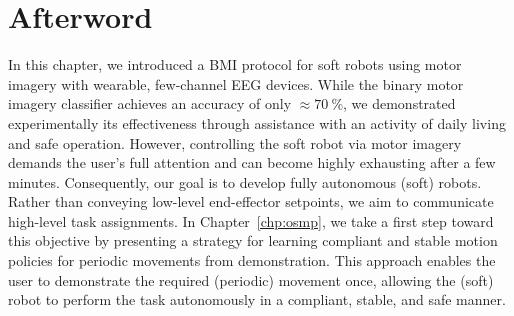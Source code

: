 \newpage







\section*{Afterword}
In this chapter, we introduced a \gls{BMI} protocol for soft robots using motor imagery with wearable, few-channel \gls{EEG} devices. While the binary motor imagery classifier achieves an accuracy of only $\approx \SI{70}{\percent}$, we demonstrated experimentally its effectiveness through assistance with an activity of daily living and safe operation. However, controlling the soft robot via motor imagery demands the user’s full attention and can become highly exhausting after a few minutes. Consequently, our goal is to develop fully autonomous (soft) robots. Rather than conveying low-level end-effector setpoints, we aim to communicate high-level task assignments. In Chapter~\ref{chp:osmp}, we take a first step toward this objective by presenting a strategy for learning compliant and stable motion policies for periodic movements from demonstration. This approach enables the user to demonstrate the required (periodic) movement once, allowing the (soft) robot to perform the task autonomously in a compliant, stable, and safe manner.